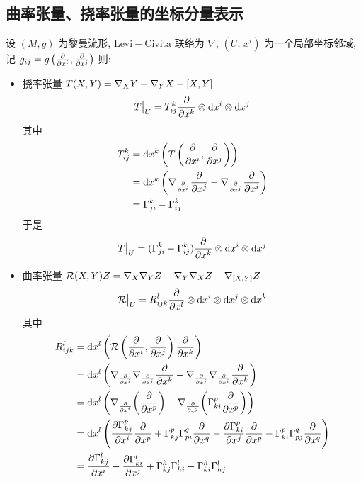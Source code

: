 \subsection{曲率张量、挠率张量的坐标分量表示}
    设 $(M,g)$ 为黎曼流形, $\mathrm{Levi-Civita}$ 联络为 $\nabla$, $(U,\,x^i)$ 为一个局部坐标邻域,
    记 $g_{ij} = g\left(\frac{\partial }{\partial x^i},\frac{\partial }{\partial x^j}\right)$ 则:
    \begin{itemize}
        \item 挠率张量 $T(X,Y) = \nabla_{X}{Y}-\nabla_{Y}{X}-[X,Y]$
        \begin{equation*}
            T\big|_U = T_{ij}^{k}\frac{\partial }{\partial x^k}\otimes{\rm d}{x^i}\otimes{\rm d}{x^j}
        \end{equation*}
        其中
        \begin{align*}
            T_{ij}^{k} &= {\rm d}{x^k}\left(T\left(\frac{\partial }{\partial x^i},\frac{\partial }{\partial x^j}\right)\right) \\
            &= {\rm d}{x^k}\left(\nabla_{\frac{\partial }{\partial x^i}}{\frac{\partial }{\partial x^j}}-\nabla_{\frac{\partial }{\partial x^j}}{\frac{\partial }{\partial x^i}}\right) \\
            &= \Gamma_{ji}^{k}-\Gamma_{ij}^{k}
        \end{align*}
        于是
        \begin{equation*}
            T\big|_U = (\Gamma_{ji}^{k}-\Gamma_{ij}^{k})\frac{\partial }{\partial x^k}\otimes{\rm d}{x^i}\otimes{\rm d}{x^j}
        \end{equation*}
        \item 曲率张量 $\mathcal{R}(X,Y)Z = \nabla_{X}{\nabla_{Y}{Z}} - \nabla_{Y}{\nabla_{X}{Z}} - \nabla_{[X,Y]}{Z}$
        \begin{equation*}
            \mathcal{R}\big|_U = R_{ijk}^{l}\frac{\partial }{\partial x^l}\otimes{\rm d}{x^i}\otimes{\rm d}{x^j}\otimes{\rm d}{x^k}
        \end{equation*}
        其中
        \begin{align*}
            R_{ijk}^{l} &= \md{x^l}\left(\mathcal{R}\left(\pd{}{x^i},\pd{}{x^j}\right)\pd{}{x^k}\right) \\
            &= \md{x^l}\left(\lc{\pd{}{x^i}}{\lc{\pd{}{x^j}}{\pd{}{x^k}}} - \lc{\pd{}{x^j}}{\lc{\pd{}{x^i}}{\pd{}{x^k}}}\right) \\
            &= \md{x^l}\left(\lc{\pd{}{x^i}}{\left(\pd{}{x^p}\right)} - \lc{\pd{}{x^j}}{\left(\Gamma_{ki}^{p}\pd{}{x^p}\right)}\right) \\
            &= \md{x^l}\left(\pd{\Gamma_{kj}^{p}}{x^i}\pd{}{x^p} + \Gamma_{kj}^{p}\Gamma_{pi}^{q}\pd{}{x^q} - \pd{\Gamma_{ki}^{p}}{x^j}\pd{}{x^p} - \Gamma_{ki}^{p}\Gamma_{pj}^{q}\pd{}{x^q}\right) \\
            &= \pd{\Gamma_{kj}^{l}}{x^i} - \pd{\Gamma_{ki}^{l}}{x^j} + \Gamma_{kj}^{h}\Gamma_{hi}^{l} - \Gamma_{ki}^{h}\Gamma_{hj}^{l}

\end{align*}
\end{itemize}
